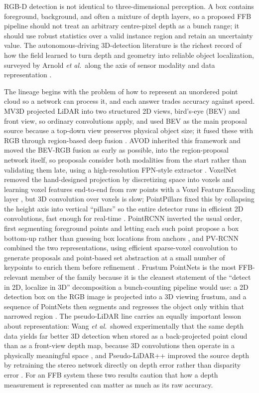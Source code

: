 RGB-D detection is not identical to three-dimensional perception. A box contains foreground, background, and often a mixture of depth layers, so a proposed FFB pipeline should not treat an arbitrary centre-pixel depth as a bunch range; it should use robust statistics over a valid instance region and retain an uncertainty value. The autonomous-driving 3D-detection literature is the richest record of how the field learned to turn depth and geometry into reliable object localization, surveyed by Arnold \textit{et al.}\ along the axis of sensor modality and data representation \cite{arnold2019survey3d}.

The lineage begins with the problem of how to represent an unordered point cloud so a network can process it, and each answer trades accuracy against speed. MV3D projected LiDAR into two structured 2D views, bird's-eye (BEV) and front view, so ordinary convolutions apply, and used BEV as the main proposal source because a top-down view preserves physical object size; it fused these with RGB through region-based deep fusion \cite{chen2017mv3d}. AVOD inherited this framework and moved the BEV-RGB fusion as early as possible, into the region-proposal network itself, so proposals consider both modalities from the start rather than validating them late, using a high-resolution FPN-style extractor \cite{ku2018avod}. VoxelNet removed the hand-designed projection by discretizing space into voxels and learning voxel features end-to-end from raw points with a Voxel Feature Encoding layer \cite{zhou2018voxelnet}, but 3D convolution over voxels is slow; PointPillars fixed this by collapsing the height axis into vertical ``pillars'' so the entire detector runs in efficient 2D convolutions, fast enough for real-time \cite{lang2019pointpillars}. PointRCNN inverted the usual order, first segmenting foreground points and letting each such point propose a box bottom-up rather than guessing box locations from anchors \cite{shi2019pointrcnn}, and PV-RCNN combined the two representations, using efficient sparse-voxel convolution to generate proposals and point-based set abstraction at a small number of keypoints to enrich them before refinement \cite{shi2020pvrcnn}. Frustum PointNets is the most FFB-relevant member of the family because it is the cleanest statement of the ``detect in 2D, localize in 3D'' decomposition a bunch-counting pipeline would use: a 2D detection box on the RGB image is projected into a 3D viewing frustum, and a sequence of PointNets then segments and regresses the object only within that narrowed region \cite{qi2018frustum}. The pseudo-LiDAR line carries an equally important lesson about representation: Wang \textit{et al.}\ showed experimentally that the same depth data yields far better 3D detection when stored as a back-projected point cloud than as a front-view depth map, because 3D convolutions then operate in a physically meaningful space \cite{wang2019pseudolidar}, and Pseudo-LiDAR++ improved the source depth by retraining the stereo network directly on depth error rather than disparity error \cite{you2020pseudolidarpp}. For an FFB system these two results caution that how a depth measurement is represented can matter as much as its raw accuracy.

